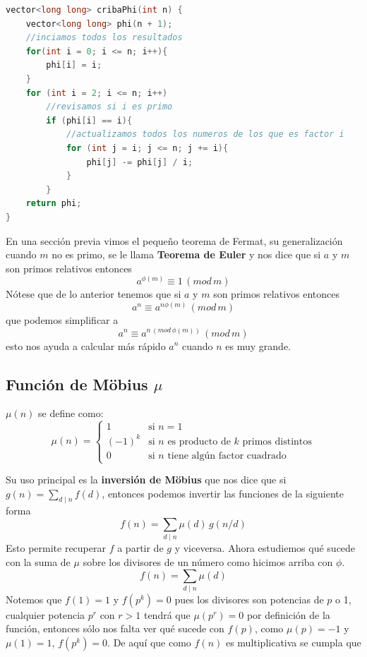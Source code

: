 \begin{lstlisting}[language=C++]
vector<long long> cribaPhi(int n) {
    vector<long long> phi(n + 1);
    //inciamos todos los resultados
    for(int i = 0; i <= n; i++){
        phi[i] = i;
    }
    for (int i = 2; i <= n; i++)
        //revisamos si i es primo
        if (phi[i] == i){
            //actualizamos todos los numeros de los que es factor i
            for (int j = i; j <= n; j += i){
                phi[j] -= phi[j] / i;
            }
        }
    return phi;
}
\end{lstlisting}
En una sección previa vimos el pequeño teorema de Fermat, su generalización cuando $m$ no es primo, se le llama \textbf{Teorema de Euler} y nos dice que si $a$ y $m$ son primos relativos entonces
\[a^{\phi(m)}\equiv 1 \,(mod \, m)\]
Nótese que de lo anterior tenemos que si $a$ y $m$ son primos relativos entonces
\[a^n\equiv a^{n\phi(m)}\, (mod\, m)\]
que podemos simplificar a
 \[a^n\equiv a^{n\,(mod \,\phi(m))}\, (mod\, m)\]
esto nos ayuda a calcular más rápido $a^n$ cuando $n$ es muy grande.

\subsection*{Función de Möbius $\mu$}
 
$\mu(n)$ se define como:
\[
\mu(n) = \begin{cases}
1  & \text{si } n = 1 \\
(-1)^k & \text{si } n \text{ es producto de } k \text{ primos distintos} \\
0  & \text{si } n \text{ tiene algún factor cuadrado}
\end{cases}
\]
 
Su uso principal es la \textbf{inversión de Möbius} que nos dice que si $g(n) = \sum_{d \mid n} f(d)$, entonces podemos invertir las funciones de la siguiente forma
\[f(n) = \sum_{d \mid n} \mu(d)\, g(n/d)\]
Esto permite recuperar $f$ a partir de $g$ y viceversa. Ahora estudiemos qué sucede con la suma de $\mu$ sobre los divisores de un número como hicimos arriba con $\phi$.
\[f(n) = \sum_{d \mid n} \mu(d)\]
Notemos que $f(1)=1$ y $f(p^k)=0$ pues los divisores son potencias de $p$ o 1, cualquier potencia $p^r$ con $r>1$ tendrá que $\mu(p^r)=0$ por definición de la función, entonces sólo nos falta ver qué sucede con $f(p)$, como $\mu(p)=-1$ y $\mu(1)=1$, $f(p^k)=0$. De aquí que como $f(n)$ es multiplicativa se cumpla que

